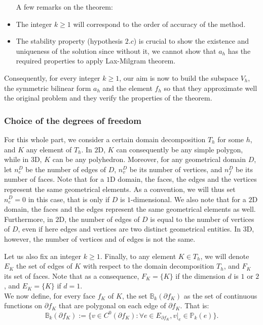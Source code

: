 \begin{remark}
\begin{itemize} A few remarks on the theorem:
\item The integer $k\geq 1$ will correspond to the order of accuracy of the method.
\item The stability property (hypothesis $2.c$) is crucial to show the existence and uniqueness of the solution since without it, we cannot show that $a_h$ has the required properties to apply Lax-Milgram theorem.
\end{itemize}
\end{remark}

Consequently, for every integer $k\geq 1$, our aim is now to build the subspace $V_h$, the symmetric bilinear form $a_h$ and the element $f_h$ so that they approximate well the original problem and they verify the properties of the theorem.

\subsubsection{Choice of the degrees of freedom}

For this whole part, we consider a certain domain decomposition $T_h$ for some $h$, and $K$ any element of $T_h$. In $2$D, $K$ can consequently be any simple polygon, while in $3$D, $K$ can be any polyhedron. Moreover, for any geometrical domain $D$, let $n_e^D$ be the number of edges of $D$, $n_v^D$ be its number of vertices, and $n_f^D$ be its number of faces. Note that for a $1$D domain, the faces, the edges and the vertices represent the same geometrical elements. As a convention, we will thus set $n_e^D = 0$ in this case, that is only if $D$ is $1$-dimensional. We also note that for a $2$D domain, the faces and the edges represent the same geometrical elements as well. Furthermore, in $2$D, the number of edges of $D$ is equal to the number of vertices of $D$, even if here edges and vertices are two distinct geometrical entities. In $3$D, however, the number of vertices and of edges is not the same.

Let us also fix an integer $k\geq 1$. Finally, to any element $K\in T_h$, we will denote $E_K$ the set of edges of $K$ with respect to the domain decomposition $T_h$, and $F_K$ its set of faces. Note that as a consequence, $F_K=\{K\}$ if the dimension $d$ is $1$ or $2$, and $E_K=\{K\}$ if $d=1$. \\

We now define, for every face $f_K$ of $K$, the set $\mathbb{B}_k(\partial f_K)$ as the set of continuous functions on $\partial f_K$ that are polygonal on each edge of $\partial f_K$. That is: 
$$ \mathbb{B}_k(\partial f_K) := \Big\{v\in C^0(\partial f_K): \forall e\in E_{\partial f_K}, v|_e \in \mathbb{P}_k(e)\Big\}.$$

